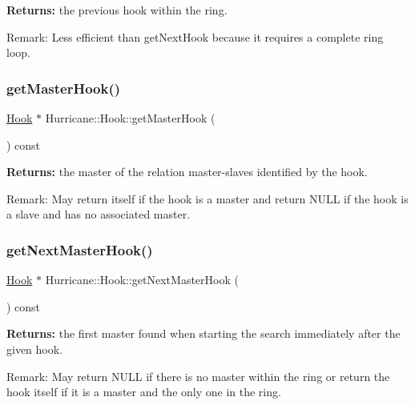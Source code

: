 {\bfseries Returns\+:} the previous hook within the ring.

\begin{DoxyParagraph}{Remark\+:}
Less efficient than get\+Next\+Hook because it requires a complete ring loop. 
\end{DoxyParagraph}
\mbox{\label{classHurricane_1_1Hook_af18e0531df4ed14b64cf058b780aee46}} 
\subsubsection{\texorpdfstring{get\+Master\+Hook()}{getMasterHook()}}
{\footnotesize\ttfamily \hyperlink{classHurricane_1_1Hook}{Hook} $\ast$ Hurricane\+::\+Hook\+::get\+Master\+Hook (\begin{DoxyParamCaption}{ }\end{DoxyParamCaption}) const}

{\bfseries Returns\+:} the master of the relation master-\/slaves identified by the hook.

\begin{DoxyParagraph}{Remark\+:}
May return itself if the hook is a master and return N\+U\+LL if the hook is a slave and has no associated master. 
\end{DoxyParagraph}
\mbox{\label{classHurricane_1_1Hook_a0923a5a2d0a7ee0458876eed72008e46}} 
\subsubsection{\texorpdfstring{get\+Next\+Master\+Hook()}{getNextMasterHook()}}
{\footnotesize\ttfamily \hyperlink{classHurricane_1_1Hook}{Hook} $\ast$ Hurricane\+::\+Hook\+::get\+Next\+Master\+Hook (\begin{DoxyParamCaption}{ }\end{DoxyParamCaption}) const}

{\bfseries Returns\+:} the first master found when starting the search immediately after the given hook.

\begin{DoxyParagraph}{Remark\+:}
May return N\+U\+LL if there is no master within the ring or return the hook itself if it is a master and the only one in the ring. 
\end{DoxyParagraph}
\mbox{\label{classHurricane_1_1Hook_a80bf5cdd4e81952064f1be94fe10188f}} 
